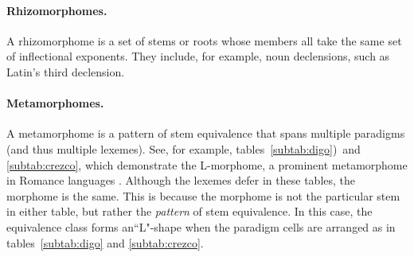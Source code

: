 \paragraph{Rhizomorphomes.} A rhizomorphome is a set of stems or roots
 whose members all take the same set of inflectional exponents. They include, for example,
 noun declensions, such as Latin's third declension.

\paragraph{Metamorphomes.} A metamorphome is a pattern of stem 
equivalence that spans multiple paradigms 
(and thus multiple lexemes). See, for example, tables~\ref{subtab:digo})\ 
and \ref{subtab:crezco}, which demonstrate the L-morphome, a prominent 
metamorphome in Romance languages \citep{maiden:2005}. Although the 
lexemes defer in these tables, the morphome is the same. This is because 
the morphome is not the particular stem in either table, but rather the 
\emph{pattern} of stem equivalence. In this case, the equivalence class 
forms  an``L"-shape when the paradigm cells are arranged as in tables~\ref{subtab:digo} 
and \ref{subtab:crezco}.
\begin{table}[t]
 \setlength{\extrarowheight}{6pt}
\centering %
\vspace{7pt}
\label{tab:l-morphome}
\caption{The stem \textit{crezc-} `say' is an L-morphome in Spanish.}
\end{table}

